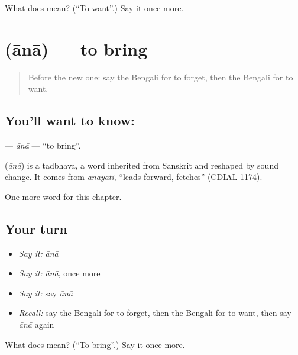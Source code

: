 \begin{tcolorbox}[breakable,colback=teal!4,colframe=teal!35!black,title={Before you move on}]
What does  mean? (\textquotedblleft{}To want\textquotedblright{}.) Say it once more.
\end{tcolorbox}
\section[\texorpdfstring{\bn{আনা} (ānā)}{আনা (ānā)}]{ (ānā) — to bring}

\label{lesson:BN-C51-ana}



\begin{quote}
Before the new one: say the Bengali for to forget, then the Bengali for to want.
\end{quote}

\subsection*{You'll want to know: }
\textbf{} — \emph{ānā} — \textquotedblleft{}to bring\textquotedblright{}.

\begin{cousinweb}
\textbf{} (\emph{ānā}) is a tadbhava, a word inherited from Sanskrit and reshaped by sound change. It comes from \emph{ānayati}, \textquotedblleft{}leads forward, fetches\textquotedblright{} (CDIAL 1174).
\end{cousinweb}

\begin{grammarlens}[title={What you've built}]
One more word for this chapter.
\end{grammarlens}

\subsection*{Your turn}
\begin{itemize}
\raggedright
  \item \emph{Say it:} \emph{ānā}
  \item \emph{Say it:} \emph{ānā}, once more
  \item \emph{Say it:} say \emph{ānā}
  \item \emph{Recall:} say the Bengali for to forget, then the Bengali for to want, then say \emph{ānā} again
\end{itemize}

\begin{tcolorbox}[breakable,colback=teal!4,colframe=teal!35!black,title={Before you move on}]
What does  mean? (\textquotedblleft{}To bring\textquotedblright{}.) Say it once more.
\end{tcolorbox}

